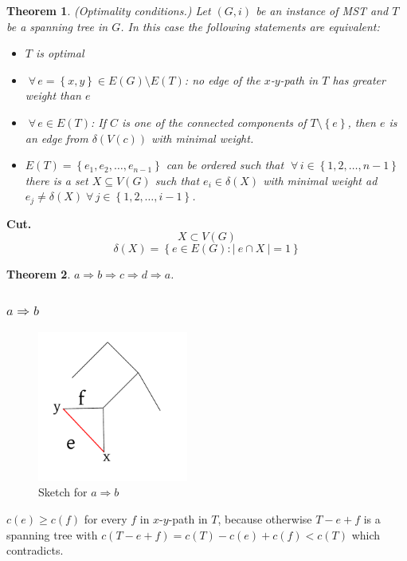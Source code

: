 \documentclass{article}
\newtheorem{theorem}{Theorem}
\newcommand{\card}[1]{\left|\:\!#1\:\!\right|}
\newcommand{\set}[1]{\left\{#1\right\}}
\newcommand{\gath}[2]{$#1$-$#2$-path} %
\newcommand{\fall}{\;\forall\,}
\begin{document}
\begin{theorem}\label{satz-2.2}
(Optimality conditions.)
Let $(G, i)$ be an instance of MST and $T$ be a spanning tree in $G$. In this case the following statements are equivalent:
\begin{itemize}
  \item $T$ is optimal
  \item $\fall e = \set{x, y} \in E(G) \setminus E(T)$: no edge of the \gath xy in $T$ has greater weight than $e$
  \item $\fall e \in E(T)$: If $C$ is one of the connected components of $T \setminus \set{e}$, then $e$ is an edge from $\delta(V(c))$ with minimal weight.
  \item $E(T) = \set{e_1, e_2, \ldots, e_{n-1}}$ can be ordered such that $\fall i \in \set{1, 2, \ldots, n-1}$ there is a set $X \subseteq V(G)$ such that $e_i \in \delta(X)$ with minimal weight ad $e_j \neq \delta(X) \fall j \in \set{1, 2, \ldots, i-1}$.
\end{itemize}
\end{theorem}

\textbf{Cut.}
\[
  X \subset V(G)
\] \[
  \delta(X) = \set{e \in E(G): \card{e \cap X} = 1}
\]

\begin{theorem}
  $a \Rightarrow b \Rightarrow c \Rightarrow d \Rightarrow a$.
\end{theorem}

\subsubsection{$a \Rightarrow b$}
%
\begin{figure}[t]
  \begin{center}
    \includegraphics[width=140pt]{img/ab.pdf}
    \caption{Sketch for $a \Rightarrow b$}
  \end{center}
\end{figure}

$c(e) \geq c(f)$
for every $f$ in \gath xy in $T$, because otherwise $T - e + f$ is a spanning tree with $c(T - e  + f) = c(T) - c(e) + c(f) < c(T)$ which contradicts.
\end{document}
